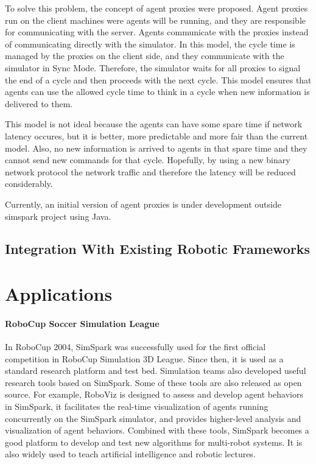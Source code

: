 \documentclass{llncs}
\begin{document}
To solve this problem, the concept of agent proxies were proposed. Agent proxies
run on the client machines were agents will be running, and they are responsible for
communicating with the server. Agents communicate with the proxies instead of 
communicating directly with the simulator. In this model, the cycle time is managed
by the proxies on the client side, and they communicate with the simulator in Sync Mode.
Therefore, the simulator waits for all proxies to signal the end of a cycle and 
then proceeds with the next cycle. This model ensures that agents can use the allowed
cycle time to think in a cycle when new information is delivered to them. 

This model is not ideal because the agents can have some spare time if network latency
occures, but it is better, more predictable and more fair than the current model. Also,
no new information is arrived to agents in that spare time and they cannot send new 
commands for that cycle. Hopefully, by using a new binary network protocol the network 
traffic and therefore the latency will be reduced considerably.

Currently, an initial version of agent proxies is under development outside simspark
project using Java.

\subsection{Integration With Existing Robotic Frameworks}


\section{Applications}
\label{s:application}
\paragraph{RoboCup Soccer Simulation League}
In RoboCup 2004, SimSpark was successfully used for the first official competition in RoboCup Simulation 3D League. Since then, it is used as a standard research platform and test bed.
Simulation teams also developed useful research tools based on SimSpark. Some of these tools are also released as open source.
For example, RoboViz\cite{Stoecker2012} is designed to assess and develop agent behaviors in SimSpark,
it facilitates the real-time visualization of agents running concurrently on the SimSpark simulator,
and provides higher-level analysis and visualization of agent behaviors. 
Combined with these tools, SimSpark becomes a good platform to develop and test new algorithms for multi-robot systems.
It is also widely used to teach artificial intelligence and robotic lectures.
\end{document}
